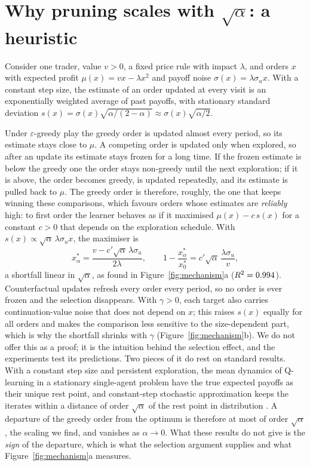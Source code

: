 \section{Why pruning scales with $\sqrt{\alpha}$: a heuristic}
\label{app:sqrt}

Consider one trader, value $v>0$, a fixed price rule with impact $\lambda$,
and orders $x$ with expected profit $\mu(x)=vx-\lambda x^2$ and payoff noise
$\sigma(x)=\lambda\sigma_u x$. With a constant step size, the estimate of an
order updated at every visit is an exponentially weighted average of past
payoffs, with stationary standard deviation
$s(x)=\sigma(x)\sqrt{\alpha/(2-\alpha)}\approx\sigma(x)\sqrt{\alpha/2}$.

Under $\varepsilon$-greedy play the greedy order is updated almost every
period, so its estimate stays close to $\mu$. A competing order is updated
only when explored, so after an update its estimate stays frozen for a long
time. If the frozen estimate is below the greedy one the order stays
non-greedy until the next exploration; if it is above, the order becomes
greedy, is updated repeatedly, and its estimate is pulled back to $\mu$. The
greedy order is therefore, roughly, the one that keeps winning these
comparisons, which favours orders whose estimates are \emph{reliably} high:
to first order the learner behaves as if it maximised
$\mu(x)-c\,s(x)$ for a constant $c>0$ that depends on the exploration
schedule. With $s(x)\propto\sqrt\alpha\,\lambda\sigma_u x$, the maximiser is
\[
x^\ast_\alpha=\frac{v-c'\sqrt\alpha\,\lambda\sigma_u}{2\lambda},
\qquad
1-\frac{x^\ast_\alpha}{x^\ast_0}=c'\sqrt\alpha\,\frac{\lambda\sigma_u}{v},
\]
a shortfall linear in $\sqrt\alpha$, as found in
Figure~\ref{fig:mechanism}a ($R^2=0.994$). Counterfactual updates
refresh every order every period, so no order is ever frozen and the
selection disappears. With $\gamma>0$, each target also carries
continuation-value noise that does not depend on $x$; this raises $s(x)$
equally for all orders and makes the comparison less sensitive to the
size-dependent part, which is why the shortfall shrinks with $\gamma$
(Figure~\ref{fig:mechanism}b). We do not offer this as a proof; it is the
intuition behind the selection effect, and the experiments test its
predictions. Two pieces of it do rest on standard results. With a constant
step size and persistent exploration, the mean dynamics of Q-learning in a
stationary single-agent problem have the true expected payoffs as their
unique rest point, and constant-step stochastic approximation keeps the
iterates within a distance of order $\sqrt\alpha$ of the rest point in
distribution \citep{kushner2003,borkar2008}. A departure of the greedy order
from the optimum is therefore at most of order $\sqrt\alpha$, the scaling we
find, and vanishes as $\alpha\to0$. What these results do not give is the
\emph{sign} of the departure, which is what the selection argument supplies
and what Figure~\ref{fig:mechanism}a measures.

